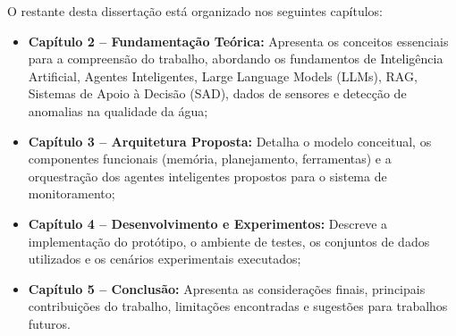 O restante desta dissertação está organizado nos seguintes capítulos:
\begin{itemize}
    \item \textbf{Capítulo 2 -- Fundamentação Teórica:} Apresenta os conceitos essenciais para a compreensão do trabalho, abordando os fundamentos de Inteligência Artificial, Agentes Inteligentes, Large Language Models (LLMs), RAG, Sistemas de Apoio à Decisão (SAD), dados de sensores e detecção de anomalias na qualidade da água;
    \item \textbf{Capítulo 3 -- Arquitetura Proposta:} Detalha o modelo conceitual, os componentes funcionais (memória, planejamento, ferramentas) e a orquestração dos agentes inteligentes propostos para o sistema de monitoramento;
    \item \textbf{Capítulo 4 -- Desenvolvimento e Experimentos:} Descreve a implementação do protótipo, o ambiente de testes, os conjuntos de dados utilizados e os cenários experimentais executados;
    \item \textbf{Capítulo 5 -- Conclusão:} Apresenta as considerações finais, principais contribuições do trabalho, limitações encontradas e sugestões para trabalhos futuros.
\end{itemize}